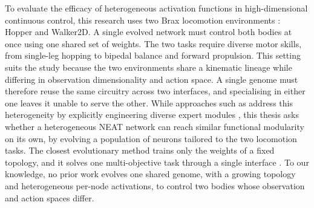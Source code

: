 To evaluate the efficacy of heterogeneous activation functions in high-dimensional continuous control, this research uses two Brax locomotion environments \parencite{freeman_brax_2021}: Hopper and Walker2D.
A single evolved network must control both bodies at once using one shared set of weights.
The two tasks require diverse motor skills, from single-leg hopping to bipedal balance and forward propulsion.
This setting suits the study because the two environments share a kinematic lineage while differing in observation dimensionality and action space. A single genome must therefore reuse the same circuitry across two interfaces, and specialising in either one leaves it unable to serve the other.
While approaches such as  address this heterogeneity by explicitly engineering diverse expert modules \parencite{zhang_mixtureofworld_2026}, this thesis asks whether a heterogeneous NEAT network can reach similar functional modularity on its own, by evolving a population of neurons tailored to the two locomotion tasks.
The closest evolutionary method trains only the weights of a fixed topology, and it solves one multi-objective task through a single interface \parencite{zhou_neuroevolutionary_2024}. To our knowledge, no prior work evolves one shared genome, with a growing topology and heterogeneous per-node activations, to control two bodies whose observation and action spaces differ.




